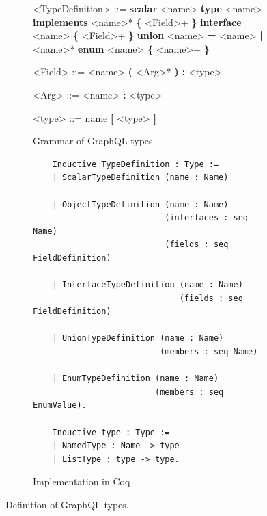 \setlength{\grammarparsep}{20pt plus 1pt minus 1pt} %
\begin{figure}
    \centering
    \begin{subfigure}{.5\textwidth}
    \begin{grammar}
    <TypeDefinition> ::= \textbf{scalar} <name> 
    \alt \textbf{type} <name> \textbf{implements} <name>* \textbf{\{} <Field>+ \textbf{\}}
    \alt \textbf{interface} <name> \textbf{\{} <Field>+ \textbf{\}}
    \alt \textbf{union} <name> \textbf{=} <name> \textbf{|} <name>*
    \alt \textbf{enum} <name> \textbf{\{} <name>+ \textbf{\}}
    
    <Field> ::= <name> \textbf{(} <Arg>* \textbf{) :} <type>
    
    <Arg> ::= <name> \textbf{:} <type>
    
    <type> ::= name
    \alt \textbf{[}  <type> \textbf{]}
    \end{grammar}
    
    \caption{Grammar of GraphQL types}
    \end{subfigure}%
    \begin{subfigure}{.5\textwidth}
    \begin{verbatim}
    Inductive TypeDefinition : Type :=
    | ScalarTypeDefinition (name : Name)
                           
    | ObjectTypeDefinition (name : Name)
                           (interfaces : seq Name)
                           (fields : seq FieldDefinition)
                           
    | InterfaceTypeDefinition (name : Name)
                              (fields : seq FieldDefinition)
                              
    | UnionTypeDefinition (name : Name)
                          (members : seq Name)
                          
    | EnumTypeDefinition (name : Name)
                         (members : seq EnumValue).
                         
    Inductive type : Type :=
    | NamedType : Name -> type
    | ListType : type -> type.
    \end{verbatim}
    
    \caption{Implementation in Coq}
    \end{subfigure}
    \caption{Definition of GraphQL types.}
    \label{fig:types_def}
\end{figure}



